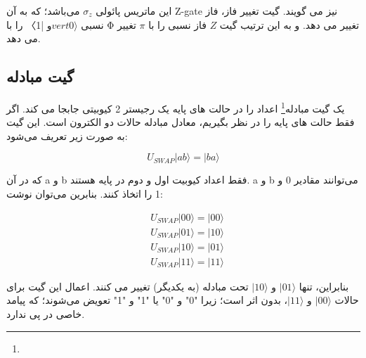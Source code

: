 \documentclass{book}
\begin{document}
 این ماتریس پائولی $ \sigma_{z}$ می‌باشد؛ که به آن Z-gate نیز می گویند. گیت تغییر فاز، فاز نسبی $vert 0 \rangle$و |1〉 را با Φ تغییر می دهد. و به این ترتیب گیت $Z$ فاز نسبی را با $\pi$ تغییر می دهد. 
 
 
 
\subsection{گیت مبادله}
یک گیت مبادله\footnote{} اعداد را در حالت های پایه یک رجیستر 2 کیوبیتی جابجا می کند. اگر فقط حالت های پایه را در نظر بگیریم، معادل مبادله حالات دو الکترون است. این گیت به صورت  زیر تعریف می‌شود:
\begin{center}
\begin{equation}
	U_{SWAP}   \vert ab\rangle = \vert ba \rangle
\end{equation}
\end{center}
که در آن a و b فقط اعداد کیوبیت اول و دوم در پایه هستند. a و b می‌توانند مقادیر 0 و 1 را اتخاذ کنند. بنابرین می‌توان نوشت:
\begin{center}
	$$\begin{aligned}
		& U_{S W A P}|00\rangle=|00\rangle \\
		& U_{S W A P}|01\rangle=|10\rangle \\
		& U_{S W A P}|10\rangle=|01\rangle \\
		& U_{S W A P}|11\rangle=|11\rangle
	\end{aligned}$$
\end{center}




بنابراین، تنها $\vert 01 \rangle$ و $\vert 10 \rangle$ تحت مبادله (به یکدیگر) تغییر می کنند.
اعمال این گیت برای حالات $\vert 00 \rangle$ و $\vert 11 \rangle$، بدون اثر است؛ زیرا "0" و "0" یا "1" و "1" تعویض می‌شوند؛ که پیامد خاصی در پی ندارد.
\end{document}
